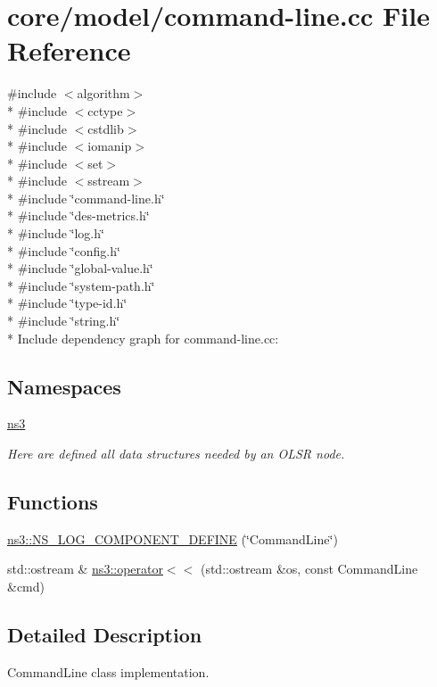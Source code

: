 \hypertarget{command-line_8cc}{}\section{core/model/command-\/line.cc File Reference}
\label{command-line_8cc}
{\ttfamily \#include $<$algorithm$>$}\\*
{\ttfamily \#include $<$cctype$>$}\\*
{\ttfamily \#include $<$cstdlib$>$}\\*
{\ttfamily \#include $<$iomanip$>$}\\*
{\ttfamily \#include $<$set$>$}\\*
{\ttfamily \#include $<$sstream$>$}\\*
{\ttfamily \#include \char`\"{}command-\/line.\+h\char`\"{}}\\*
{\ttfamily \#include \char`\"{}des-\/metrics.\+h\char`\"{}}\\*
{\ttfamily \#include \char`\"{}log.\+h\char`\"{}}\\*
{\ttfamily \#include \char`\"{}config.\+h\char`\"{}}\\*
{\ttfamily \#include \char`\"{}global-\/value.\+h\char`\"{}}\\*
{\ttfamily \#include \char`\"{}system-\/path.\+h\char`\"{}}\\*
{\ttfamily \#include \char`\"{}type-\/id.\+h\char`\"{}}\\*
{\ttfamily \#include \char`\"{}string.\+h\char`\"{}}\\*
Include dependency graph for command-\/line.cc\+:
\subsection*{Namespaces}
\begin{DoxyCompactItemize}
\item 
 \hyperlink{namespacens3}{ns3}
\begin{DoxyCompactList}\small\item\em Here are defined all data structures needed by an O\+L\+SR node. \end{DoxyCompactList}\end{DoxyCompactItemize}
\subsection*{Functions}
\begin{DoxyCompactItemize}
\item 
\hyperlink{namespacens3_af29cdbf27dcad65cf862e91494ab9e26}{ns3\+::\+N\+S\+\_\+\+L\+O\+G\+\_\+\+C\+O\+M\+P\+O\+N\+E\+N\+T\+\_\+\+D\+E\+F\+I\+NE} (\char`\"{}Command\+Line\char`\"{})
\item 
std\+::ostream \& \hyperlink{namespacens3_af0089a784a5dac17bc4cdeced18072ed}{ns3\+::operator$<$$<$} (std\+::ostream \&os, const Command\+Line \&cmd)
\end{DoxyCompactItemize}


\subsection{Detailed Description}
Command\+Line class implementation. 